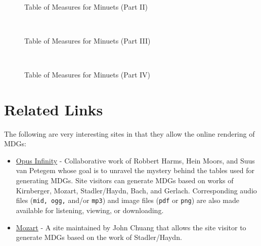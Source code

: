 \documentclass[a4paper,x11names,svgnames,10pt]{article}
\begin{document}
{\newpage
${}_{}$\\
\vspace{0.10in}
\begin{figure}[H]
	\centering
	\def\svgwidth{0.975\columnwidth}
	
	\caption{Table of Measures for Minuets (Part II)}
	\label{fig:meas2}
\end{figure}

\newpage
${}_{}$\\
\vspace{0.10in}
\begin{figure}[H]
	\centering
	\def\svgwidth{0.975\columnwidth}
	
	\caption{Table of Measures for Minuets (Part III)}
	\label{fig:meas3}
\end{figure}

\newpage
${}_{}$\\
\vspace{0.10in}
\begin{figure}[H]
	\centering
	\def\svgwidth{0.975\columnwidth}
	
	\caption{Table of Measures for Minuets (Part IV)}
	\label{fig:meas4}
\end{figure}

\newpage
\section{Related Links}
The following are very interesting sites in that they allow the online rendering of MDGs:
\begin{itemize}
	\item \href{https://opus-infinity.org}{Opus Infinity} - Collaborative work of Robbert Harms, Hein Moors, and Suus van Petegem whose goal is to unravel the mystery behind the tables used for generating MDGs.  Site visitors can generate MDGs based on works of Kirnberger, Mozart, Stadler/Haydn, Bach, and Gerlach.  Corresponding audio files ({\tt mid, ogg,} and/or {\tt mp3}) and image files ({\tt pdf} or {\tt png}) are also made available for listening, viewing, or downloading.
	
	\item  \href{http://sunsite.univie.ac.at/Mozart/dice/}{Mozart} - A site maintained by John Chuang that allows the site visitor to generate MDGs based on the work of Stadler/Haydn.
 	

\end{itemize}}
\end{document}
